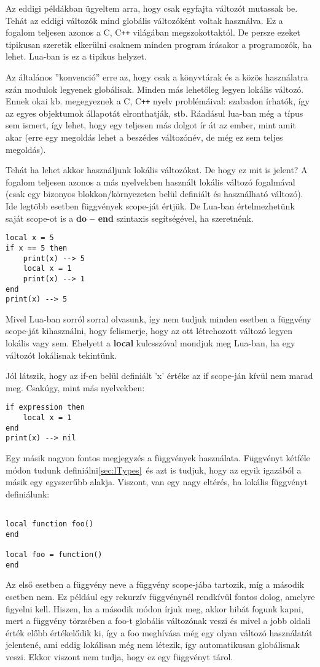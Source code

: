 Az eddigi példákban ügyeltem arra, hogy csak egyfajta változót mutassak be. Tehát az eddigi változók mind globális változóként voltak használva. Ez a fogalom teljesen azonos a C, C\verb|++| világában megszokottaktól. De persze ezeket tipikusan szeretik elkerülni csaknem minden program írásakor a programozók, ha lehet. Lua-ban is ez a tipikus helyzet. 

Az általános ''konvenció'' erre az, hogy csak a könyvtárak és a közös használatra szán modulok legyenek globálisak. Minden más lehetőleg legyen lokális változó. Ennek okai kb. megegyeznek a C, C\verb|++| nyelv problémáival: szabadon írhatók, így az egyes objektumok állapotát elronthatják, stb. Ráadásul lua-ban még a típus sem ismert, így lehet, hogy egy teljesen más dolgot ír át az ember, mint amit akar (erre egy megoldás lehet a beszédes változónév, de még ez sem teljes megoldás). 

Tehát ha lehet akkor használjunk lokális változókat. De hogy ez mit is jelent? A fogalom teljesen azonos a más nyelvekben használt lokális változó fogalmával (csak egy bizonyos blokkon/környezeten belül definiált és használható változó). Ide legtöbb esetben függvények scope-ját értjük. De Lua-ban értelmezhetünk saját scope-ot is a \textbf{do -- end} szintaxis segítségével, ha szeretnénk.
\scriptsize
\begin{lstlisting}
local x = 5
if x == 5 then
	print(x) --> 5
	local x = 1
	print(x) --> 1
end
print(x) --> 5
\end{lstlisting}
\normalsize
Mivel Lua-ban sorról sorral olvasunk, így nem tudjuk minden esetben a függvény scope-ját kihasználni, hogy felismerje, hogy az ott létrehozott változó legyen lokális vagy sem. Ehelyett a \textbf{local} kulcsszóval mondjuk meg Lua-ban, ha egy változót lokálisnak tekintünk.

Jól látszik, hogy az if-en belül definiált 'x' értéke az if scope-ján kívül nem marad meg. Csakúgy, mint más nyelvekben:
\scriptsize
\begin{lstlisting}
if expression then
	local x = 1
end
print(x) --> nil
\end{lstlisting}
\normalsize
Egy másik nagyon fontos megjegyzés a függvények használata. Függvényt kétféle módon tudunk definiálni\ref{sec:lTypes}~és azt is tudjuk, hogy az egyik igazából a másik egy egyszerűbb alakja. Viszont, van egy nagy eltérés, ha lokális függvényt definiálunk:
\scriptsize
\begin{lstlisting}

local function foo()
end

local foo = function()
end
\end{lstlisting}
\normalsize
Az első esetben a függvény neve a függvény scope-jába tartozik, míg a második esetben nem. Ez például egy rekurzív függvénynél rendkívül fontos dolog, amelyre figyelni kell. Hiszen, ha a második módon írjuk meg, akkor hibát fogunk kapni, mert a függvény törzsében a foo-t globális változónak veszi és mivel a jobb oldali érték előbb értékelődik ki, így a foo meghívása még egy olyan változó használatát jelentené, ami eddig lokálisan még nem létezik, így automatikusan globálisnak veszi. Ekkor viszont nem tudja, hogy ez egy függvényt tárol.

